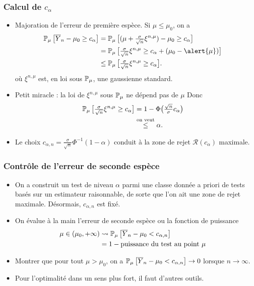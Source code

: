 \begin{frame}
\frametitle{Calcul de $c_\alpha$}
\begin{itemize}
\item \alert{Majoration de l'erreur de première espèce}. Si $\mu \leq \mu_0$, on a
\begin{align*}
\PP_{\mu}\big[\overline{Y}_n - \mu_0 \geq c_\alpha\big] & = \PP_\mu\big[(\mu+\tfrac{\sigma}{\sqrt{n}}\xi^{n,\mu})-\mu_0 \geq c_\alpha\big] \\
& =   \PP_{\mu}\big[\tfrac{\sigma}{\sqrt{n}}\xi^{n,\mu} \geq c_\alpha + (\mu_0-\alert{\mu})\big] \\
& \leq \PP_{\mu}\big[\tfrac{\sigma}{\sqrt{n}}\xi^{n,\mu} \geq c_\alpha\big].
\end{align*}
où $\xi^{n,\mu}$ est, en loi sous $\operatorname{{\mathbb P}}_\mu$, une gaussienne standard.
\item \alert{ Petit miracle} : la loi de $\xi^{n,\mu}$ sous $\operatorname{{\mathbb P}}_\mu$ ne \alert{dépend pas de} $\mu$
Donc
\begin{align*}
\operatorname{{\mathbb P}}_{\mu}\big[\tfrac{\sigma}{\sqrt{n}}\xi^{n,\mu} \geq c_\alpha\big] & =1-\Phi\big(\tfrac{\sqrt{n}}{\sigma}c_\alpha\big) \\
& \stackrel{\text{on veut}}{\leq} \alpha.
\end{align*}
\item Le choix $c_{\alpha,n} = \tfrac{\sigma}{\sqrt{n}}\Phi^{-1}(1-\alpha)$ conduit à la zone de rejet ${\mathcal R}(c_\alpha)$ \alert{maximale}.
\end{itemize}
\end{frame}

\begin{frame}
\frametitle{Contrôle de l'erreur de seconde espèce}
\begin{itemize}
\item On a construit un test de niveau $\alpha$ parmi une classe \alert{donnée a priori} de tests basés sur un estimateur  raisonnable, de sorte que l'on ait une zone de rejet maximale. Désormais, $c_{\alpha, n}$ est \alert{fixé}.
\item On \alert{évalue à la main} l'erreur de seconde espèce ou la \alert{fonction de puissance}
\begin{align*}
\mu \in (\mu_0,+\infty) & \leadsto \operatorname{{\mathbb P}}_\mu\big[\overline{Y}_n - \mu_0 < c_{\alpha,n}\big] \\
&= 1 - {\text{puissance du test au point }}\mu
\end{align*}
\item \alert{Montrer que} pour tout $\mu > \mu_0$, on a $\operatorname{{\mathbb P}}_\mu\big[\overline{Y}_n - \mu_0 < c_{\alpha,n}\big] \rightarrow 0$ lorsque $n\rightarrow \infty$.
\item Pour l'optimalité dans un sens plus fort, il faut \alert{ d'autres outils}.
\end{itemize}
\end{frame}

